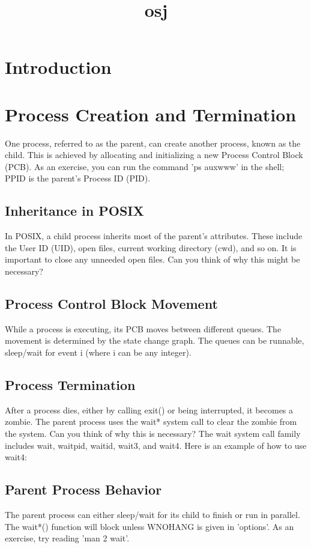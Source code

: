 \documentclass[12pt]{report}
\title{osj}
\author{}
\begin{document}
\maketitle
\tableofcontents
\newpage

\section{Introduction}
  \section{Process Creation and Termination}    One process, referred to as the parent, can create another process, known as the child. This is achieved by allocating and initializing a new Process Control Block (PCB). As an exercise, you can run the command 'ps auxwww' in the shell; PPID is the parent's Process ID (PID).    \subsection{Inheritance in POSIX}    In POSIX, a child process inherits most of the parent's attributes. These include the User ID (UID), open files, current working directory (cwd), and so on. It is important to close any unneeded open files. Can you think of why this might be necessary?    \subsection{Process Control Block Movement}    While a process is executing, its PCB moves between different queues. The movement is determined by the state change graph. The queues can be runnable, sleep/wait for event i (where i can be any integer).    \subsection{Process Termination}    After a process dies, either by calling exit() or being interrupted, it becomes a zombie. The parent process uses the wait* system call to clear the zombie from the system. Can you think of why this is necessary? The wait system call family includes wait, waitpid, waitid, wait3, and wait4. Here is an example of how to use wait4:    \subsection{Parent Process Behavior}    The parent process can either sleep/wait for its child to finish or run in parallel. The wait*() function will block unless WNOHANG is given in 'options'. As an exercise, try reading 'man 2 wait'.  
\end{document}
